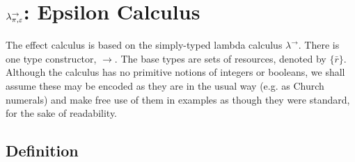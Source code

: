 \section{$\lambda^{\rightarrow}_{\pi, \varepsilon}$: Epsilon Calculus}


The effect calculus is based on the simply-typed lambda calculus $\lambda^{\rightarrow}$. There is one type constructor, $\rightarrow$. The base types are sets of resources, denoted by $\{ \bar r \}$. Although the calculus has no primitive notions of integers or booleans, we shall assume these may be encoded as they are in the usual way (e.g. as Church numerals) and make free use of them in examples as though they were standard, for the sake of readability.

\subsection{Definition}

